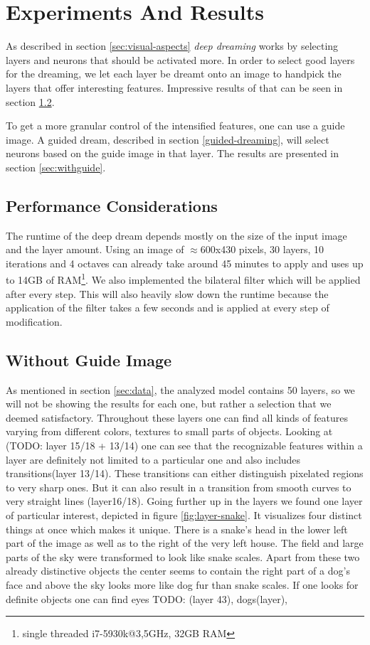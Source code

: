 \section{Experiments And Results}
\label{sec:evaluation}
As described in section \ref{sec:visual-aspects} \emph{deep dreaming} works by selecting layers and neurons that should be activated more.
In order to select good layers for the dreaming, we let each layer be dreamt onto an image to handpick the layers that offer interesting features.
Impressive results of that can be seen in section \ref{sec:withoutguide}.

To get a more granular control of the intensified features, one can use a guide image.
A guided dream, described in section \ref{guided-dreaming}, will select neurons based on the guide image in that layer.
The results are presented in section \ref{sec:withguide}.


\subsection{Performance Considerations}
\label{sec:performance}
The runtime of the deep dream depends mostly on the size of the input image and the layer amount.
Using an image of $\approx$600x430 pixels, 30 layers, 10 iterations and 4 octaves can already take around 45 minutes to apply and uses up to 14GB of RAM\footnote{single threaded i7-5930k@3,5GHz, 32GB RAM}.
We also implemented the bilateral filter which will be applied after every step.\cite{bilateral}
This will also heavily slow down the runtime because the application of the filter takes a few seconds and is applied at every step of modification.


\subsection{Without Guide Image}
\label{sec:withoutguide}

As mentioned in section \ref{sec:data}, the analyzed model contains 50 layers, so we will not be showing the results for each one, but rather a selection that we deemed satisfactory.
Throughout these layers one can find all kinds of features varying from different colors, textures to small parts of objects.
Looking at (TODO: layer 15/18 + 13/14) one can see that the recognizable features within a layer are definitely not limited to a particular one and also includes transitions(layer 13/14).
These transitions can either distinguish pixelated regions to very sharp ones.
But it can also result in a transition from smooth curves to very straight lines (layer16/18).
Going further up in the layers we found one layer of particular interest, depicted in figure \ref{fig:layer-snake}.
It visualizes four distinct things at once which makes it unique.
There is a snake's head in the lower left part of the image as well as to the right of the very left house.
The field and large parts of the sky were transformed to look like snake scales.
Apart from these two already distinctive objects the center seems to contain the right part of a dog's face and above the sky looks more like dog fur than snake scales.  
If one looks for definite objects one can find eyes TODO: (layer 43), dogs(layer), 

